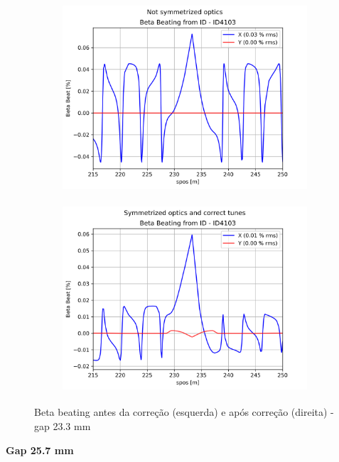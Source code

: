 \documentclass[a4paper,12pt]{article}
\begin{document}
\begin{figure}[H]
\begin{subfigure}{0.5\textwidth}
\includegraphics[width=0.9\linewidth, height=7cm]{figs/phase-25 gap23 uncorrected-optics.png} 
\label{fig:subim1-2523}
\end{subfigure}
\begin{subfigure}{0.5\textwidth}
\includegraphics[width=0.9\linewidth, height=7cm]{figs/phase-25 gap23 corrected-optics-tunes.png}
\label{fig:subim2-2523}
\end{subfigure}
\caption{Beta beating antes da correção (esquerda) e após correção (direita) - gap 23.3 mm}
\label{fig:bb-25_23}
\end{figure}

\textbf{Gap 25.7 mm} \\
\end{document}
